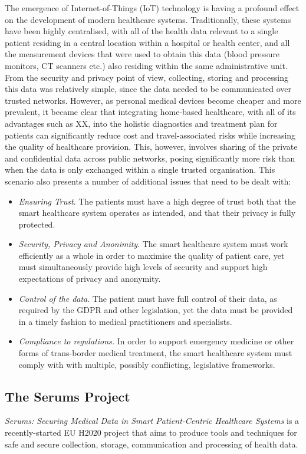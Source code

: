 \noindent
The emergence of Internet-of-Things (IoT) technology is having a profound effect on the development of modern healthcare systems. Traditionally, these systems have been highly centralised, with all of the health data relevant to a single patient residing in a central location within a hospital or health center, and all the measurement devices that were used to obtain this data (blood pressure monitors, CT scanners etc.) also residing within the same administrative unit. From the security and privacy point of view, collecting, storing and processing this data was relatively simple, since the data needed to be communicated over trusted networks. However, as personal medical devices become cheaper and more prevalent, it became clear that integrating home-based healthcare, with all of its advantages such as XX, into the holistic diagnostics and treatment plan for patients can significantly reduce cost and travel-associated risks while increasing the quality of healthcare provision. This, however, involves sharing of the private and confidential data across public networks, posing significantly more risk than when the data is only exchanged within a single trusted organisation. This scenario also presents a number of additional issues that need to be dealt with:
\begin{itemize}
    \item \emph{Ensuring Trust}. The patients must have a high degree of trust both that the smart healthcare system operates as intended, and that their privacy is fully protected.
    \item \emph{Security, Privacy and Anonimity}. The smart healthcare system must work efficiently as a whole in order to maximise the quality of patient care, yet must simultaneously provide high levels of security and support high expectations of privacy and anonymity.
    \item \emph{Control of the data}. The patient must have full control of their data, as required by the GDPR and other legislation, yet the data must be provided in a timely fashion to medical practitioners and specialists.
    \item \emph{Compliance to regulations.} In order to support emergency medicine or other forms of trans-border medical treatment, the smart healthcare system must comply with with multiple, possibly conflicting, legislative frameworks.
\end{itemize}

\subsection{The Serums Project}
\emph{Serums: Securing Medical Data in Smart Patient-Centric Healthcare Systems} is a recently-started EU H2020 project that aims to produce tools and techniques for safe and secure collection, storage, communication and processing of health data. 
\noindent


